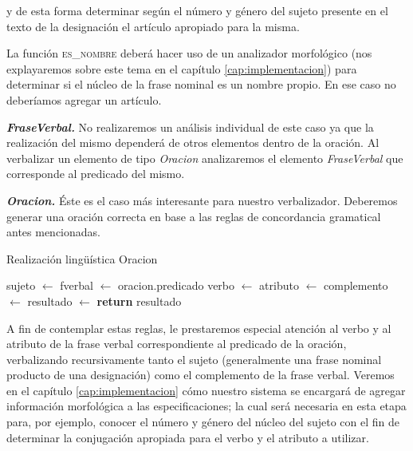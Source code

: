 \noindent
y de esta forma determinar según el número y género del sujeto presente en el texto de la designación el artículo apropiado para la misma.

La función \textsc{es\_nombre} deberá hacer uso de un analizador morfológico (nos explayaremos sobre este tema en el capítulo \ref{cap:implementacion}) para determinar si el núcleo de la frase nominal es un nombre propio. En ese caso no deberíamos agregar un artículo.

\medskip
\noindent
\textbf{\emph{FraseVerbal.}} No realizaremos un análisis individual de este caso ya que la realización del mismo dependerá de otros elementos dentro de la oración. Al verbalizar un elemento de tipo \emph{Oracion} analizaremos el elemento \emph{FraseVerbal} que corresponde al predicado del mismo.


\medskip
\noindent
\textbf{\emph{Oracion.}} Éste es el caso más interesante para nuestro verbalizador. Deberemos generar una oración correcta en base a las reglas de concordancia gramatical antes mencionadas. 

\begin{algorithm}[H]
\caption{Realización lingüística Oracion}
\begin{algorithmic}[1]
\State sujeto $\gets$ 
\State fverbal $\gets$ oracion.predicado
\State verbo $\gets$ 
\State atributo $\gets$ 
\State complemento $\gets$ 
\State resultado $\gets$ 
\State \textbf{return} resultado
\EndFunction
\end{algorithmic}
\end{algorithm}

\noindent
A fin de contemplar estas reglas, le prestaremos especial atención al verbo y al atributo de la frase verbal correspondiente al predicado de la oración, verbalizando recursivamente tanto el sujeto (generalmente una frase nominal producto de una designación) como el complemento de la frase verbal. Veremos en el capítulo \ref{cap:implementacion} cómo nuestro sistema se encargará de agregar información morfológica a las especificaciones; la cual será necesaria en esta etapa para, por ejemplo, conocer el número y género del núcleo del sujeto con el fin de determinar la conjugación apropiada para el verbo y el atributo a utilizar.

